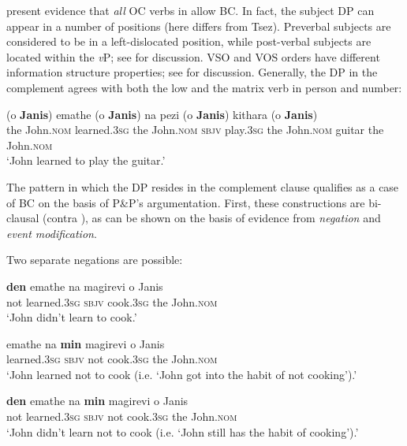 \documentclass[output=paper]{langsci/langscibook}
\begin{document}
\citet{Alexiadou2010} present evidence that \emph{all} OC verbs in  allow BC. In fact, the subject DP can appear in a number of positions (here  differs from Tsez). Preverbal subjects are considered to be in a left-dislocated position, while post-verbal subjects are located within the \textit{v}P; see \citet{Alexiadou1998} for discussion. VSO and VOS orders have different information structure properties; see \citet{Alexiadou1999,Alexiadou2000} for discussion.  Generally, the DP in the  complement agrees with both the low and the matrix verb in person and number:



\ea%
    \label{ex:alexiadou:6}
    \gll (o \textbf{Janis}) emathe (o \textbf{Janis}) na pezi  (o \textbf{Janis}) kithara (o \textbf{Janis})\\
         the John.\textsc{nom} learned.\textsc{3sg} the John.\textsc{nom} \textsc{sbjv} play.\textsc{3sg} the John.\textsc{nom} guitar the John.\textsc{nom}\\
    \glt    ‘John learned to play the guitar.’
    \z

The pattern in which the DP resides in the complement clause qualifies as a case of BC on the basis of P\&P’s argumentation. First, these constructions are bi-clausal (contra \citealt{Roussou2009}), as can be shown on the basis of evidence from \textit{negation} and \textit{event modification}.

Two separate negations are possible:

\ea%
    \label{ex:alexiadou:7}
\ea
\gll    \textbf{den}  emathe    na    magirevi   o    Janis\\
    not   learned.\textsc{3sg}  \textsc{sbjv}  cook.\textsc{3sg}    the    John.\textsc{nom}\\
\glt    ‘John didn’t learn to cook.’

\ex
\gll    emathe     na   \textbf{min}   magirevi    o    Janis\\
    learned.\textsc{3sg}  \textsc{sbjv} not  cook.\textsc{3sg} the   John.\textsc{nom}\\
\glt ‘John learned not to cook (i.e. ‘John got into the habit of not cooking’).’

\ex
\gll    \textbf{den}   emathe    na   \textbf{min} magirevi    o    Janis\\
    not  learned.\textsc{3sg}  \textsc{sbjv} not  cook.\textsc{3sg}    the   John.\textsc{nom}\\
\glt    ‘John didn’t learn not to cook (i.e. ‘John still has the habit of cooking’).’
\z
\z
\end{document}
